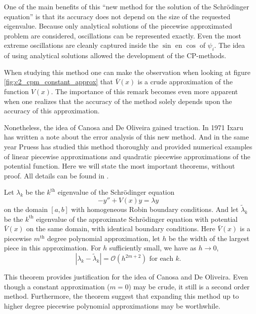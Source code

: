 One of the main benefits of this ``new method for the solution of the Schrödinger equation'' \cite{canosa_new_1970} is that its accuracy does not depend on the size of the requested eigenvalue. Because only analytical solutions of the piecewise approximated problem are considered, oscillations can be represented exactly. Even the most extreme oscillations are cleanly captured inside the $\sin$ en $\cos$ of $\psi_i$. The idea of using analytical solutions allowed the development of the CP-methods.

When studying this method one can make the observation when looking at figure \ref{fig:c2_cpm_constant_approx} that $\bar{V}(x)$ is a crude approximation of the function $V(x)$. The importance of this remark becomes even more apparent when one realizes that the accuracy of the method solely depends upon the accuracy of this approximation.

Nonetheless, the idea of Canosa and De Oliveira gained traction. In 1971 Ixaru \cite{ixaru_error_1972} has written a note about the error analysis of this new method. And in the same year Pruess \cite{pruess_estimating_1973} has studied this method thoroughly and provided numerical examples of linear piecewise approximations and quadratic piecewise approximations of the potential function. Here we will state the most important theorems, without proof. All details can be found in \cite{pruess_estimating_1973}.

\begin{theorem}[Pruess 1973]\label{the:c2_pruess_1973_1}
    Let $\lambda_k$ be the $k^\text{th}$ eigenvalue of the Schrödinger equation
    $$
        -y'' + V(x) y = \lambda y
    $$
    on the domain $[a, b]$ with homogeneous Robin boundary conditions. And let $\tilde{\lambda}_k$ be the $k^\text{th}$ eigenvalue of the approximate Schrödinger equation with potential $\bar{V}(x)$ on the same domain, with identical boundary conditions. Here $\bar{V}(x)$ is a piecewise $m^\text{th}$ degree polynomial approximation, let $h$ be the width of the largest piece in this approximation. For $h$ sufficiently small, we have as $h \to 0$,
    $$
        |\lambda_k - \tilde{\lambda}_k| = \mathcal{O}(h^{2m + 2}) \text{ for each $k$.}
    $$
\end{theorem}

This theorem provides justification for the idea of Canosa and De Oliveira. Even though a constant approximation ($m = 0$) may be crude, it still is a second order method. Furthermore, the theorem suggest that expanding this method up to higher degree piecewise polynomial approximations may be worthwhile.

